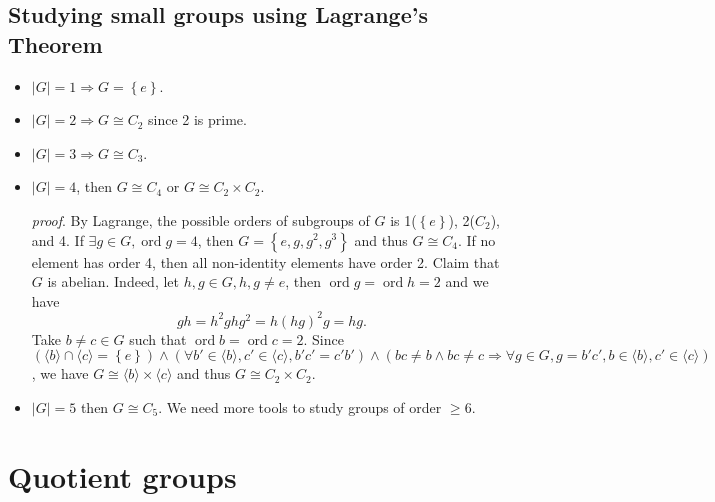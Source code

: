 \documentclass[10pt]{article}
\def\ge{\geqslant}
\DeclareMathOperator{\ord}{ord}
\begin{document}
    \subsection{Studying small groups using Lagrange's Theorem}
    \begin{example}
        \begin{itemize}
            \item $|G|=1 \Rightarrow G=\left\{ e\right\}$.
            \item $ |G|=2 \Rightarrow G \cong C_2 $ since 2 is prime.
            \item $|G|=3 \Rightarrow G \cong C_3$.
            \item $|G|=4$, then $ G \cong C_4 $ or $ G \cong C_2\times C_2 $.

            \textit{proof}. By Lagrange, the possible orders of subgroups of $G$ is 1($ \left\{ e\right\} $), 2($C_2$), and 4. If $ \exists g\in G, \ord g=4$, then $ G=\left\{ e,g,g^2,g^3\right\} $ and thus $ G \cong C_4 $. If no element has order 4, then all non-identity elements have order 2. Claim that $G$ is abelian. Indeed, let $ h,g\in G, h,g\neq e $, then $ \ord g=\ord h=2 $ and we have 
            \[
                gh=h^2ghg^2=h(hg)^2g=hg
            .\]
            Take $ b\neq c\in G $ such that $\ord b=\ord c=2$. Since $ (\langle b \rangle \cap \langle c \rangle = \left\{ e\right\}) \land (\forall b'\in \langle b \rangle,c'\in \langle c \rangle, b'c'=c'b') \land (bc\neq b \land bc\neq c \Rightarrow \forall g\in G, g=b'c', b\in \langle b \rangle, c'\in \langle c \rangle  )   $, we have $ G \cong \langle b \rangle \times \langle c \rangle $ and thus $ G \cong C_2 \times C_2 $.
            \item $ |G|=5 $ then $ G \cong C_5 $. We need more tools to study groups of order $ \ge 6 $.
        \end{itemize}
    \end{example}
    \section{Quotient groups}
\end{document}
